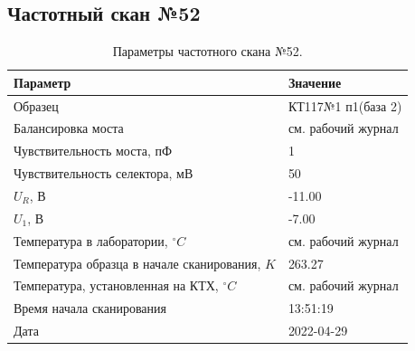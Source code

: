 \subsection{Частотный скан №52}
\begin{table}[!ht]
    \centering
    \caption{Параметры частотного скана №52.}
    \begin{tabular}{|l|l|}
        \hline
        Параметр                                       & Значение                  \\ \hline
        Образец                                        & КТ117№1 п1(база 2)        \\ \hline
        Балансировка моста                             & см. рабочий журнал        \\ \hline
        Чувствительность моста, пФ                     & 1                         \\ \hline
        Чувствительность селектора, мВ                 & 50                        \\ \hline
        $U_R$, В                                       & -11.00                    \\ \hline
        $U_1$, В                                       & -7.00                     \\ \hline
        Температура в лаборатории, $^\circ C$          & см. рабочий журнал        \\ \hline
        Температура образца в начале сканирования, $K$ & 263.27                    \\ \hline
        Температура, установленная на КТХ, $^\circ C$  & см. рабочий журнал        \\ \hline
        Время начала сканирования                      & 13:51:19                  \\ \hline
        Дата                                           & 2022-04-29                \\ \hline
    \end{tabular}
    \label{table:frequency_scan_52}
\end{table}

